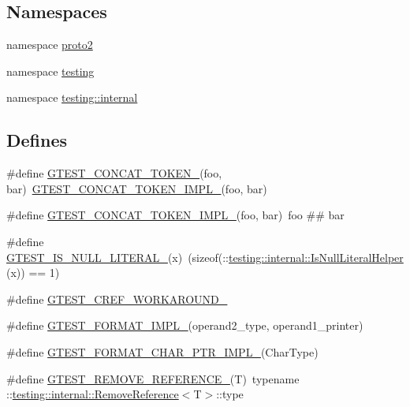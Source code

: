 \subsection*{\-Namespaces}
\begin{DoxyCompactItemize}
\item 
namespace \hyperlink{namespaceproto2}{proto2}
\item 
namespace \hyperlink{namespacetesting}{testing}
\item 
namespace \hyperlink{namespacetesting_1_1internal}{testing\-::internal}
\end{DoxyCompactItemize}
\subsection*{\-Defines}
\begin{DoxyCompactItemize}
\item 
\#define \hyperlink{gtest-internal_8h_ae3c336cbe1ae2bd1b1d019333e4428a0}{\-G\-T\-E\-S\-T\-\_\-\-C\-O\-N\-C\-A\-T\-\_\-\-T\-O\-K\-E\-N\-\_\-}(foo, bar)~\hyperlink{gtest-internal_8h_aa39fb5346d3573feebe4257cb3a01fde}{\-G\-T\-E\-S\-T\-\_\-\-C\-O\-N\-C\-A\-T\-\_\-\-T\-O\-K\-E\-N\-\_\-\-I\-M\-P\-L\-\_\-}(foo, bar)
\item 
\#define \hyperlink{gtest-internal_8h_aa39fb5346d3573feebe4257cb3a01fde}{\-G\-T\-E\-S\-T\-\_\-\-C\-O\-N\-C\-A\-T\-\_\-\-T\-O\-K\-E\-N\-\_\-\-I\-M\-P\-L\-\_\-}(foo, bar)~foo \#\# bar
\item 
\#define \hyperlink{gtest-internal_8h_ae5dd8e23090e08856613878fa1ff6fca}{\-G\-T\-E\-S\-T\-\_\-\-I\-S\-\_\-\-N\-U\-L\-L\-\_\-\-L\-I\-T\-E\-R\-A\-L\-\_\-}(x)~(sizeof(\-::\hyperlink{namespacetesting_1_1internal_a22c4be07d56f4f76ad08b35bfd40a685}{testing\-::internal\-::\-Is\-Null\-Literal\-Helper}(x)) == 1)
\item 
\#define \hyperlink{gtest-internal_8h_ac526c7e0df64d606e623de1a00cf73b7}{\-G\-T\-E\-S\-T\-\_\-\-C\-R\-E\-F\-\_\-\-W\-O\-R\-K\-A\-R\-O\-U\-N\-D\-\_\-}
\item 
\#define \hyperlink{gtest-internal_8h_a9d2f77d9ad16a7bb876b0bc41e15a88f}{\-G\-T\-E\-S\-T\-\_\-\-F\-O\-R\-M\-A\-T\-\_\-\-I\-M\-P\-L\-\_\-}(operand2\-\_\-type, operand1\-\_\-printer)
\item 
\#define \hyperlink{gtest-internal_8h_abd492da206ad86996a729e287fd0d303}{\-G\-T\-E\-S\-T\-\_\-\-F\-O\-R\-M\-A\-T\-\_\-\-C\-H\-A\-R\-\_\-\-P\-T\-R\-\_\-\-I\-M\-P\-L\-\_\-}(\-Char\-Type)
\item 
\#define \hyperlink{gtest-internal_8h_a84c72f25a6a6600e3ff8381ca6982ae9}{\-G\-T\-E\-S\-T\-\_\-\-R\-E\-M\-O\-V\-E\-\_\-\-R\-E\-F\-E\-R\-E\-N\-C\-E\-\_\-}(\-T)~typename \-::\hyperlink{structtesting_1_1internal_1_1RemoveReference}{testing\-::internal\-::\-Remove\-Reference}$<$\-T$>$\-::type

\end{DoxyCompactItemize}
